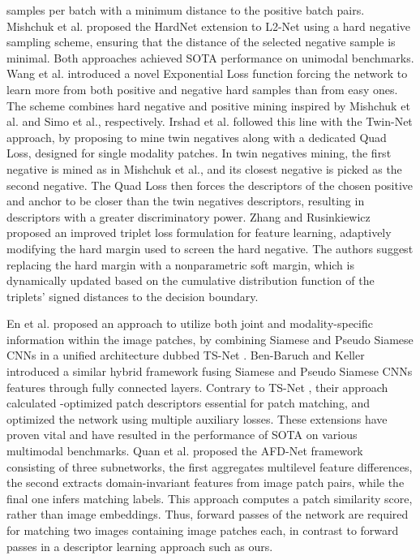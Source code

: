 \documentclass[10pt,journal]{IEEEtran}\usepackage{amsfonts}
\begin{document}
samples per batch with a minimum distance to the  positive batch pairs.
Mishchuk et al. proposed the HardNet extension \cite{HardNet} to L2-Net \cite {L2Net} using a hard negative sampling scheme, ensuring that the distance of
the selected negative sample is minimal. Both approaches achieved SOTA
performance on unimodal benchmarks. Wang et al. introduced a novel
Exponential Loss function \cite{BetterAndFaster} forcing the network to
learn more from both positive and negative hard samples than from easy ones.
The scheme combines hard negative and positive mining inspired by Mishchuk
et al.\cite{HardNet} and Simo et al.\cite{SimoSerra}, respectively. Irshad
et al. followed this line with the Twin-Net \cite{Twin_net} approach, by
proposing to mine twin negatives along with a dedicated Quad Loss, designed
for single modality patches. In twin negatives mining, the first negative is
mined as in Mishchuk et al.\cite{HardNet}, and its closest negative is
picked as the second negative. The Quad Loss then forces the descriptors of
the chosen positive and anchor to be closer than the twin negatives
descriptors, resulting in descriptors with a greater discriminatory power.
Zhang and Rusinkiewicz \cite{ZhangCDF} proposed an improved triplet loss
formulation for feature learning, adaptively modifying the hard margin used
to screen the hard negative. The authors suggest replacing the hard margin
with a nonparametric soft margin, which is dynamically updated based on the
cumulative distribution function of the triplets' signed distances to the
decision boundary.

En et al. proposed an approach to utilize both joint and modality-specific
information within the image patches, by combining Siamese and Pseudo
Siamese CNNs in a unified architecture dubbed TS-Net \cite{TS-net}.
Ben-Baruch and Keller \cite{multisensor} introduced a similar hybrid
framework fusing Siamese and Pseudo Siamese CNNs features through fully
connected layers. Contrary to TS-Net \cite{TS-net}, their approach
calculated -optimized patch descriptors essential for patch matching,
and optimized the network using multiple auxiliary losses. These extensions
have proven vital and have resulted in the performance of SOTA on various
multimodal benchmarks. Quan et al. proposed the AFD-Net framework \cite {AFD_net} consisting of three subnetworks, the first aggregates multilevel
feature differences, the second extracts domain-invariant features from
image patch pairs, while the final one infers matching labels. This approach
computes a patch similarity score, rather than image embeddings. Thus,  forward passes of the network are required for matching
two images containing  image patches each, in contrast to 
forward passes in a descriptor learning approach such as ours.
\end{document}
